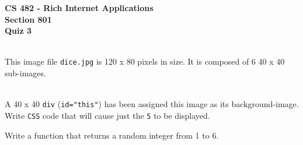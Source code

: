 \documentclass[letterpaper]{exam}
\begin{document}
\begin{center}
	\textbf{CS 482 - Rich Internet Applications} \\
	\textbf{Section 801} \\
	\textbf{Quiz 3} \\
	\vspace{5mm}
	 \\
\end{center}


\begin{questions}
	\question[5] This image file \texttt{dice.jpg} is 120 x 80 pixels in size. It is composed of 6 40 x 40 sub-images.
		\begin{figure}[ht!]
			\centering
		\end{figure}
	\\
		A 40 x 40 \texttt{div} (\texttt{id="this"}) has been assigned this image as its background-image. Write \texttt{CSS} code that will cause just the \texttt{5} to be displayed.
	
	\question[5] Write a function that returns a random integer from 1 to 6.
		
\end{questions}
\end{document}
